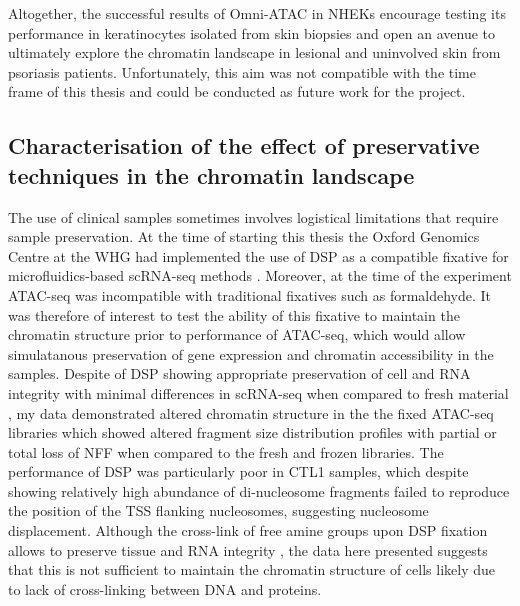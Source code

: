 Altogether, the successful results of Omni-ATAC in NHEKs encourage testing its performance in keratinocytes isolated from skin biopsies and open an avenue to ultimately explore the chromatin landscape in lesional and uninvolved skin from psoriasis patients. Unfortunately, this aim was not compatible with the time frame of this thesis and could be conducted as future work for the project.



\subsection{Characterisation of the effect of preservative techniques in the chromatin landscape}
The use of clinical samples sometimes involves logistical limitations that require sample preservation. At the time of starting this thesis the Oxford Genomics Centre at the WHG had implemented the use of DSP as a compatible fixative for microfluidics-based scRNA-seq methods \parencite{Attar2018}. Moreover, at the time of the experiment ATAC-seq was incompatible with traditional fixatives such as formaldehyde. It was therefore of interest to test the ability of this fixative to maintain the chromatin structure prior to performance of ATAC-seq, which would allow simulatanous preservation of gene expression and chromatin accessibility in the samples. Despite of DSP showing appropriate preservation of cell and RNA integrity with minimal differences in scRNA-seq when compared to fresh material \parencite{Attar2018}, my data demonstrated altered chromatin structure in the the fixed ATAC-seq libraries which showed altered fragment size distribution profiles with partial or total loss of NFF when compared to the fresh and frozen libraries. The performance of DSP was particularly poor in CTL1 samples, which despite showing relatively high abundance of di-nucleosome fragments failed to reproduce the position of the TSS flanking nucleosomes, suggesting nucleosome displacement. Although the cross-link of free amine groups upon DSP fixation allows to preserve tissue and RNA integrity \parencite{Espina2013Attar2018}, the data here presented suggests that this is not sufficient to maintain the chromatin structure of cells likely due to lack of cross-linking between DNA and proteins. 

